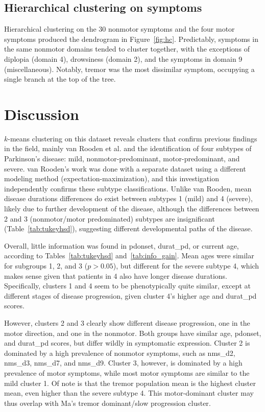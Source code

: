 \documentclass[preprint,3p,twocolumn]{elsarticle} %
\begin{document}
\subsection{Hierarchical clustering on symptoms}

Hierarchical clustering on the 30 nonmotor symptoms and the four motor symptoms produced the
dendrogram in Figure~\ref{fig:hc}. Predictably, symptoms in the same nonmotor domains tended to
cluster together, with the exceptions of diplopia (domain 4), drowsiness (domain 2), and the
symptoms in domain 9 (miscellaneous). Notably, tremor was the most dissimilar symptom, occupying a
single branch at the top of the tree.

\section{Discussion}

$k$-means clustering on this dataset reveals clusters that confirm previous
findings in the field, mainly van Rooden et al.\cite{vanrooden10} and the identification of four
subtypes of Parkinson's disease: mild, nonmotor-predominant, motor-predominant, and severe.  van
Rooden's work was done with a separate dataset using a different modeling method
(expectation-maximization), and this investigation independently confirms these subtype
classifications. Unlike van Rooden, mean disease durations differences do exist between subtypes 1
(mild) and 4 (severe), likely due to further development of the disease, although the differences
between 2 and 3 (nonmotor/motor predominated) subtypes are insignificant
(Table~\ref{tab:tukeyhsd}), suggesting different developmental paths of the disease.

Overall, little information was found in pdonset,
durat\_pd, or current age, according to Tables~\ref{tab:tukeyhsd}
and~\ref{tab:info_gain}.  Mean ages were similar for subgroups 1, 2, and 3 ($p >
0.05$), but different for the severe subtype 4, which makes sense given that
patients in 4 also have longer disease durations. Specifically, clusters 1 and
4 seem to be phenotypically quite similar, except at different stages of
disease progression, given cluster 4's higher age and durat\_pd scores.

However, clusters 2 and 3 clearly show different disease progression, one in
the motor direction, and one in the nonmotor. Both groups have similar age,
pdonset, and durat\_pd scores, but differ wildly in symptomatic expression.
Cluster 2 is dominated by a high prevalence of nonmotor symptoms, such as
nms\_d2, nms\_d3, nms\_d7, and nms\_d9. Cluster 3, however, is dominated by a
high prevalence of motor symptoms, while most motor symptoms are similar to the
mild cluster 1. Of note is that the tremor population mean
is the highest cluster mean, even higher than the severe subtype 4. This
motor-dominant cluster may thus overlap with Ma's tremor dominant/slow
progression cluster\cite{ma15}.
\end{document}

